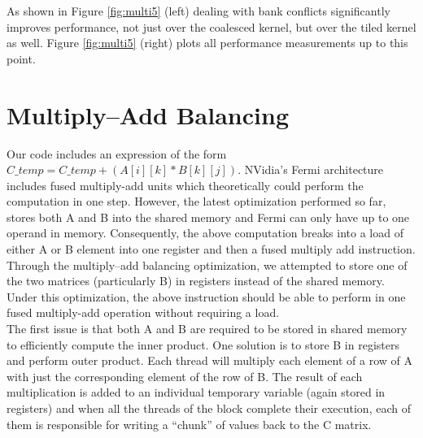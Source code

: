 \documentclass[paper=a4, fontsize=11pt]{scrartcl} %
\numberwithin{equation}{section} %
\numberwithin{figure}{section} %
\numberwithin{table}{section} %
\begin{document}
As shown in Figure \ref{fig:multi5} (left) dealing with bank conflicts significantly improves performance, not just over the coalesced kernel, but over the tiled kernel as well. Figure \ref{fig:multi5} (right) plots all performance measurements up to this point.\\

\section{\textbf{Multiply--Add Balancing}}

Our code includes an expression of the form $C\_temp = C\_temp + (A[i][k] * B[k][j])$. NVidia's Fermi architecture includes fused multiply-add units which theoretically could perform the computation in one step. However, the latest optimization performed so far, stores both A and B into the shared memory and Fermi can only have up to one operand in memory. Consequently, the above computation breaks into a load of either A or B element into one  register and then a fused multiply add instruction. Through the multiply--add balancing optimization, we attempted to store one of the two matrices (particularly B) in registers instead of the shared memory. Under this optimization, the above instruction should be able to perform in one fused multiply-add operation without requiring a load.\\

The first issue is that both A and B are required to be stored in shared memory to efficiently compute the inner product. One solution is to store B in registers and perform outer product. Each thread will multiply each element of a row of A with just the corresponding element of the row of B. The result of each multiplication is added to an individual temporary variable (again stored in registers) and when all the threads of the block complete their execution, each of them is responsible for writing a ``chunk'' of values back to the C matrix.\\
\end{document}
